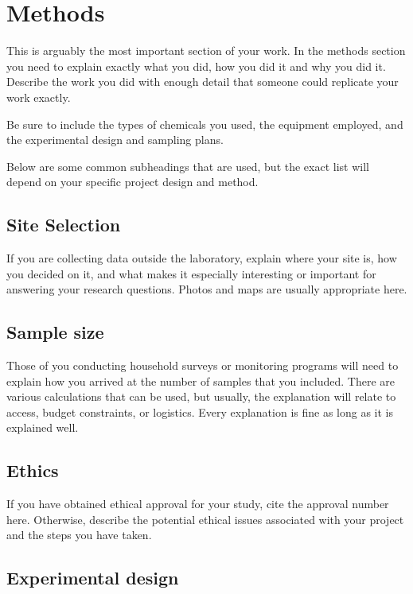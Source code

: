 \cleardoublepage%
\chapter{\label{chap:methods}Methods}%

This is arguably the most important section of your work.  In the methods section you need to explain exactly what you did, how you did it and why you did it. Describe the work you did with enough detail that someone could replicate your work exactly.

Be sure to include the types of chemicals you used, the equipment employed, and the experimental design and sampling plans.

Below are some common subheadings that are used, but the exact list will depend on your specific project design and method.

\section{\label{sec:methods_site_sel}Site Selection}

If you are collecting data outside the laboratory, explain where your site is, how you decided on it, and what makes it especially interesting or important for answering your research questions. Photos and maps are usually appropriate here.

\section{\label{sec:methods_samp_size}Sample size}

Those of you conducting household surveys or monitoring programs will need to explain how you arrived at the number of samples that you included. There are various calculations that can be used, but usually, the explanation will relate to access, budget constraints, or logistics. Every explanation is fine as long as it is explained well.

\section{\label{sec:methods_ethics}Ethics}

If you have obtained ethical approval for your study, cite the approval number here. Otherwise, describe the potential ethical issues associated with your project and the steps you have taken.

\section{\label{sec:methods_exp_des}Experimental design}

